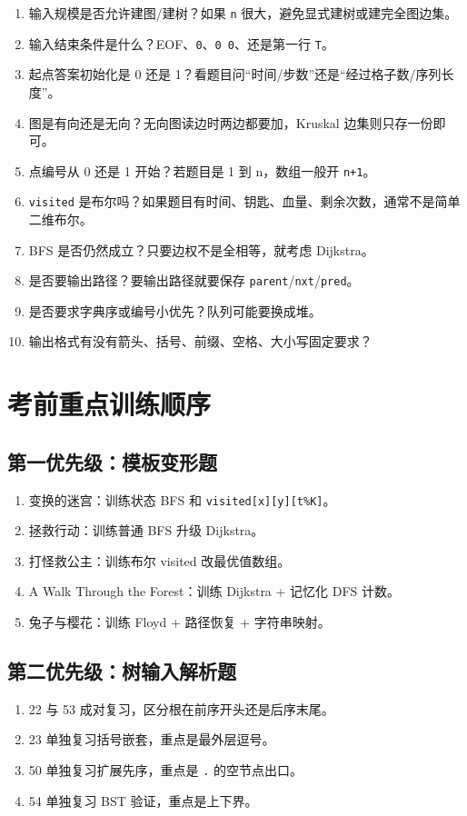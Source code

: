 \documentclass[10pt,a4paper,fontset=none]{ctexart}
\begin{document}
\begin{checkbox}
\begin{enumerate}
  \item 输入规模是否允许建图/建树？如果 \texttt{n} 很大，避免显式建树或建完全图边集。
  \item 输入结束条件是什么？EOF、\texttt{0}、\texttt{0 0}、还是第一行 \texttt{T}。
  \item 起点答案初始化是 0 还是 1？看题目问“时间/步数”还是“经过格子数/序列长度”。
  \item 图是有向还是无向？无向图读边时两边都要加，Kruskal 边集则只存一份即可。
  \item 点编号从 0 还是 1 开始？若题目是 1 到 n，数组一般开 \texttt{n+1}。
  \item \texttt{visited} 是布尔吗？如果题目有时间、钥匙、血量、剩余次数，通常不是简单二维布尔。
  \item BFS 是否仍然成立？只要边权不是全相等，就考虑 Dijkstra。
  \item 是否要输出路径？要输出路径就要保存 \texttt{parent}/\texttt{nxt}/\texttt{pred}。
  \item 是否要求字典序或编号小优先？队列可能要换成堆。
  \item 输出格式有没有箭头、括号、前缀、空格、大小写固定要求？
\end{enumerate}
\end{checkbox}

\section{考前重点训练顺序}

\subsection{第一优先级：模板变形题}
\begin{enumerate}
  \item 变换的迷宫：训练状态 BFS 和 \texttt{visited[x][y][t\%K]}。
  \item 拯救行动：训练普通 BFS 升级 Dijkstra。
  \item 打怪救公主：训练布尔 visited 改最优值数组。
  \item A Walk Through the Forest：训练 Dijkstra + 记忆化 DFS 计数。
  \item 兔子与樱花：训练 Floyd + 路径恢复 + 字符串映射。
\end{enumerate}

\subsection{第二优先级：树输入解析题}
\begin{enumerate}
  \item 22 与 53 成对复习，区分根在前序开头还是后序末尾。
  \item 23 单独复习括号嵌套，重点是最外层逗号。
  \item 50 单独复习扩展先序，重点是 \texttt{.} 的空节点出口。
  \item 54 单独复习 BST 验证，重点是上下界。
\end{enumerate}
\end{document}
